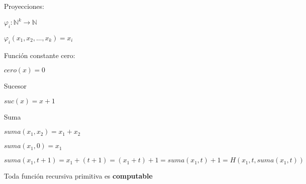 Proyecciones:
 
$\varphi_i : \mathbb{N}^k \rightarrow \mathbb{N}$
 
$\varphi_i (x_1, x_2, \ldots, x_k) = x_i$
 
Funci\'on constante cero:
 
$cero(x) = 0$
 
Sucesor
 
$suc(x) = x + 1$
 
Suma
 
$suma(x_1, x_2) = x_1 + x_2$
 
$suma(x_1, 0) = x_1$
 
$suma (x_1, t + 1) = x_1 + (t + 1) = (x_1 + t) + 1 = suma(x_1, t) + 1 = H(x_1, t, suma(x_1, t))$
 
\begin{colorario}
Toda funci\'on recursiva primitiva es \textbf{computable}
\end{colorario}